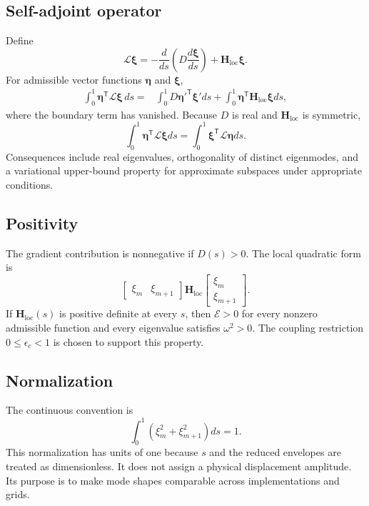 \subsection{Self-adjoint operator}
Define
\begin{equation}
\mathcal L\boldsymbol\xi
=-\frac{d}{ds}\left(D\frac{d\boldsymbol\xi}{ds}\right)
+\mathbf H_{\mathrm{loc}}\boldsymbol\xi.
\end{equation}
For admissible vector functions $\boldsymbol\eta$ and $\boldsymbol\xi$,
\begin{align}
\int_0^1\boldsymbol\eta^{\mathsf T}\mathcal L\boldsymbol\xi\,ds
={}&\int_0^1
D\boldsymbol\eta'^{\mathsf T}\boldsymbol\xi' ds
+\int_0^1\boldsymbol\eta^{\mathsf T}\mathbf H_{\mathrm{loc}}\boldsymbol\xi ds,
\end{align}
where the boundary term has vanished. Because $D$ is real and $\mathbf H_{\mathrm{loc}}$ is symmetric,
\begin{equation}
\int_0^1\boldsymbol\eta^{\mathsf T}\mathcal L\boldsymbol\xi ds
=\int_0^1\boldsymbol\xi^{\mathsf T}\mathcal L\boldsymbol\eta ds.
\label{eq:reduced_self_adjoint}
\end{equation}
Consequences include real eigenvalues, orthogonality of distinct eigenmodes, and a variational upper-bound property for approximate subspaces under appropriate conditions.

\subsection{Positivity}
The gradient contribution is nonnegative if $D(s)>0$. The local quadratic form is
\begin{equation}
\begin{bmatrix}\xi_m&\xi_{m+1}\end{bmatrix}
\mathbf H_{\mathrm{loc}}
\begin{bmatrix}\xi_m\\\xi_{m+1}\end{bmatrix}.
\end{equation}
If $\mathbf H_{\mathrm{loc}}(s)$ is positive definite at every $s$, then $\mathcal E>0$ for every nonzero admissible function and every eigenvalue satisfies $\omega^2>0$. The coupling restriction $0\le\epsilon_c<1$ is chosen to support this property.

\subsection{Normalization}
The continuous convention is
\begin{equation}
\boxed{
\int_0^1\left(\xi_m^2+\xi_{m+1}^2\right)ds=1.}
\label{eq:benchmark_normalization}
\end{equation}
This normalization has units of one because $s$ and the reduced envelopes are treated as dimensionless. It does not assign a physical displacement amplitude. Its purpose is to make mode shapes comparable across implementations and grids.

